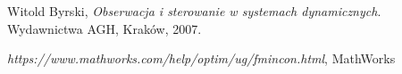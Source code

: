 \begin{thebibliography}{}
	
	
%

  Witold Byrski,
  \emph{Obserwacja i sterowanie w systemach dynamicznych}.
  Wydawnictwa AGH, Kraków, 2007.	

\emph{https://www.mathworks.com/help/optim/ug/fmincon.html},
MathWorks
\end{thebibliography}